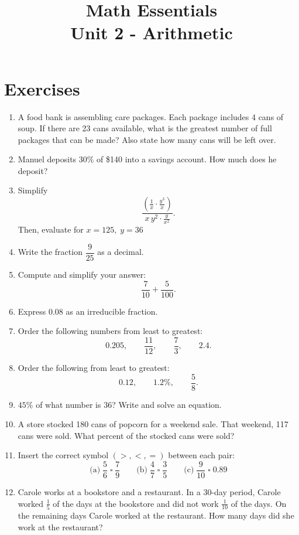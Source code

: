 \documentclass{article}
\title{Math Essentials \\ Unit 2 - Arithmetic}
\author{}
\date{}
\begin{document}
\maketitle

\section*{Exercises}

\begin{enumerate}[label=\textbf{\arabic*.}, leftmargin=*, itemsep=0.6em]

\item A food bank is assembling care packages. Each package includes 4 cans of soup. If there are 23 cans available, what is the greatest number of full packages that can be made? Also state how many cans will be left over.

\item Manuel deposits 30\% of \$140 into a savings account. How much does he deposit?

\item Simplify
\[
\frac{\left(\frac{1}{x}\cdot \frac{y^{3}}{x}\right)}{x\,y^{2}\cdot \frac{y}{x^{2}}}.
\]
Then, evaluate for $x=125,\; y=36$

\item Write the fraction $\dfrac{9}{25}$ as a decimal.

\item Compute and simplify your answer:
\[
\frac{7}{10}+\frac{5}{100}.
\]

\item Express $0.08$ as an irreducible fraction.

\item Order the following numbers from least to greatest:
\[
0.205,\qquad \frac{11}{12},\qquad \frac{7}{3},\qquad 2.4.
\]

\item Order the following from least to greatest:
\[
0.12,\qquad 1.2\%,\qquad \frac{5}{8}.
\]

\item \(45\%\) of what number is \(36\)? Write and solve an equation.

\item A store stocked 180 cans of popcorn for a weekend sale. That weekend, 117 cans were sold. What percent of the stocked cans were sold?

\item Insert the correct symbol $(>,<,=)$ between each pair:
\[
\text{(a)}\;\frac{5}{6}\;\square\;\frac{7}{9}
\qquad
\text{(b)}\;\frac{4}{7}\;\square\;\frac{3}{5}
\qquad
\text{(c)}\;\frac{9}{10}\;\square\;0.89
\]

\item Carole works at a bookstore and a restaurant. In a 30-day period, Carole worked $\frac{1}{5}$ of the days at the bookstore and did not work $\frac{1}{10}$ of the days. On the remaining days Carole worked at the restaurant. How many days did she work at the restaurant?

\end{enumerate}
\end{document}
